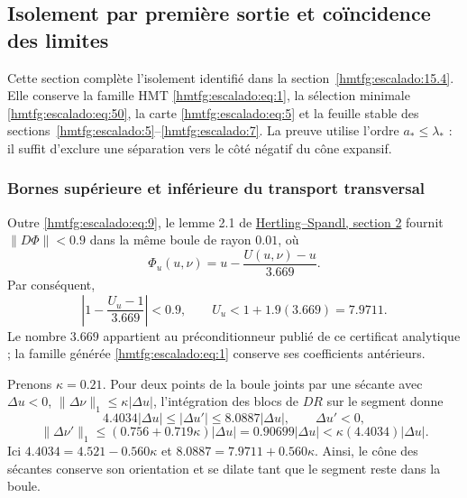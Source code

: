 \subsection{Isolement par première sortie et coïncidence des limites}
\label{hmtfg:escalado:16}

Cette section complète l’isolement identifié dans la section~\ref{hmtfg:escalado:15.4}. Elle conserve la famille HMT \eqref{hmtfg:escalado:eq:1}, la sélection minimale \eqref{hmtfg:escalado:eq:50}, la carte \eqref{hmtfg:escalado:eq:5} et la feuille stable des sections~\ref{hmtfg:escalado:5}--\ref{hmtfg:escalado:7}. La preuve utilise l’ordre \(a_*\le\lambda_*\) : il suffit d’exclure une séparation vers le côté négatif du cône expansif.

\subsubsection{Bornes supérieure et inférieure du transport transversal}
\label{hmtfg:escalado:16.1}

Outre \eqref{hmtfg:escalado:eq:9}, le lemme 2.1 de \href{https://arxiv.org/pdf/1410.3277}{Hertling–Spandl, section 2} fournit \(\|D\Phi\|<0.9\) dans la même boule de rayon \(0.01\), où
\[
\Phi_u(u,\nu)=u-\frac{U(u,\nu)-u}{3.669}.
\]
Par conséquent,
\begin{equation}
\left|1-\frac{U_u-1}{3.669}\right|<0.9,\qquad
U_u<1+1.9(3.669)=7.9711.
\label{hmtfg:escalado:eq:53}
\end{equation}
Le nombre \(3.669\) appartient au préconditionneur publié de ce certificat analytique ; la famille générée \eqref{hmtfg:escalado:eq:1} conserve ses coefficients antérieurs.

Prenons \(\kappa=0.21\). Pour deux points de la boule joints par une sécante avec
\(\Delta u<0\), \(\|\Delta\nu\|_1\le\kappa|\Delta u|\), l’intégration des blocs de \(DR\) sur le segment donne
\begin{equation}
4.4034|\Delta u|
\le|\Delta u'|\le8.0887|\Delta u|,\qquad \Delta u'<0,
\label{hmtfg:escalado:eq:54}
\end{equation}
\begin{equation}
\|\Delta\nu'\|_1
\le(0.756+0.719\kappa)|\Delta u|
=0.90699|\Delta u|
<\kappa(4.4034)|\Delta u|.
\label{hmtfg:escalado:eq:55}
\end{equation}
Ici \(4.4034=4.521-0.560\kappa\) et \(8.0887=7.9711+0.560\kappa\). Ainsi, le cône des sécantes conserve son orientation et se dilate tant que le segment reste dans la boule.

